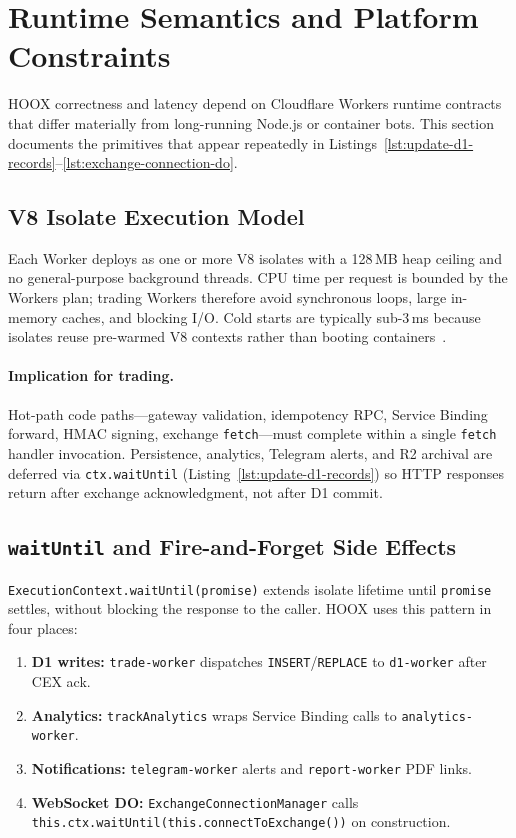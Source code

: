 \section{Runtime Semantics and Platform Constraints}
\label{sec:runtime}

\textsc{HOOX} correctness and latency depend on Cloudflare Workers runtime contracts that differ materially from long-running Node.js or container bots. This section documents the primitives that appear repeatedly in Listings~\ref{lst:update-d1-records}--\ref{lst:exchange-connection-do}.

\subsection{V8 Isolate Execution Model}

Each Worker deploys as one or more V8 isolates with a 128\,MB heap ceiling and no general-purpose background threads. CPU time per request is bounded by the Workers plan; trading Workers therefore avoid synchronous loops, large in-memory caches, and blocking I/O. Cold starts are typically sub-3\,ms because isolates reuse pre-warmed V8 contexts rather than booting containers~\cite{cloudflare-workers}.

\paragraph{Implication for trading.} Hot-path code paths---gateway validation, idempotency RPC, Service Binding forward, HMAC signing, exchange \texttt{fetch}---must complete within a single \texttt{fetch} handler invocation. Persistence, analytics, Telegram alerts, and R2 archival are deferred via \texttt{ctx.waitUntil} (Listing~\ref{lst:update-d1-records}) so HTTP responses return after exchange acknowledgment, not after D1 commit.

\subsection{\texttt{waitUntil} and Fire-and-Forget Side Effects}

\texttt{ExecutionContext.waitUntil(promise)} extends isolate lifetime until \texttt{promise} settles, without blocking the response to the caller. \textsc{HOOX} uses this pattern in four places:

\begin{enumerate}
  \item \textbf{D1 writes:} \texttt{trade-worker} dispatches \texttt{INSERT}/\texttt{REPLACE} to \texttt{d1-worker} after CEX ack.
  \item \textbf{Analytics:} \texttt{trackAnalytics} wraps Service Binding calls to \texttt{analytics-worker}.
  \item \textbf{Notifications:} \texttt{telegram-worker} alerts and \texttt{report-worker} PDF links.
  \item \textbf{WebSocket DO:} \texttt{ExchangeConnectionManager} calls \texttt{this.ctx.waitUntil(this.connectToExchange())} on construction.
\end{enumerate}

